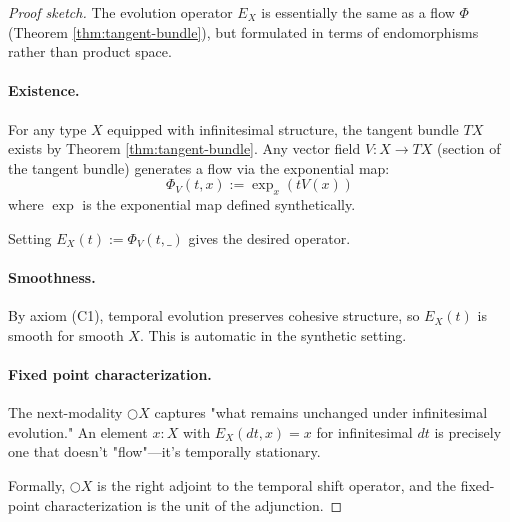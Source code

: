 \documentclass[11pt]{article}
\theoremstyle{definition}
\begin{document}
\begin{proof}[Proof sketch]
The evolution operator $E_X$ is essentially the same as a flow $\Phi$ (Theorem \ref{thm:tangent-bundle}), but formulated in terms of endomorphisms rather than product space.

\paragraph{Existence.}
For any type $X$ equipped with infinitesimal structure, the tangent bundle $TX$ exists by Theorem \ref{thm:tangent-bundle}. Any vector field $V : X \to TX$ (section of the tangent bundle) generates a flow via the exponential map:
\[
\Phi_V(t, x) := \exp_x(tV(x))
\]
where $\exp$ is the exponential map defined synthetically.

Setting $E_X(t) := \Phi_V(t, \_)$ gives the desired operator.

\paragraph{Smoothness.}
By axiom (C1), temporal evolution preserves cohesive structure, so $E_X(t)$ is smooth for smooth $X$. This is automatic in the synthetic setting.

\paragraph{Fixed point characterization.}
The next-modality $\bigcirc X$ captures "what remains unchanged under infinitesimal evolution." An element $x : X$ with $E_X(dt, x) = x$ for infinitesimal $dt$ is precisely one that doesn't "flow"—it's temporally stationary.

Formally, $\bigcirc X$ is the right adjoint to the temporal shift operator, and the fixed-point characterization is the unit of the adjunction.
\end{proof}
\end{document}
